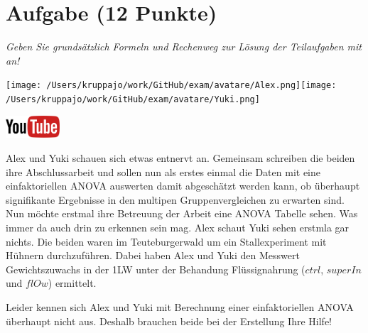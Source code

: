 \documentclass[a4paper, 9pt]{scrartcl}\usepackage[]{graphicx}\usepackage[]{xcolor}
\begin{document}
 
\clearpage

\section{Aufgabe \hfill (12 Punkte)}

\textit{Geben Sie grundsätzlich Formeln und Rechenweg zur Lösung der Teilaufgaben mit an!} \\[1Ex]
 

 
\begin{minipage}[t]{0.5\textwidth}
\texttt{[image: /Users/kruppajo/work/GitHub/exam/avatare/Alex.png]}\hspace{-4mm}\texttt{[image: /Users/kruppajo/work/GitHub/exam/avatare/Yuki.png]}
\end{minipage}
\begin{minipage}[t]{0.5\textwidth}
\hfill
\href{https://youtu.be/49hvImMwVyE}{\includegraphics[width = 2cm]{img/youtube}}
\end{minipage}
\vspace{1ex}



Alex und Yuki schauen sich etwas entnervt an. Gemeinsam schreiben die beiden ihre Abschlussarbeit und sollen nun als erstes einmal die Daten mit eine einfaktoriellen ANOVA auswerten damit abgeschätzt werden kann, ob überhaupt signifikante Ergebnisse in den multipen Gruppenvergleichen zu erwarten sind. Nun möchte erstmal ihre Betreuung der Arbeit eine ANOVA Tabelle sehen. Was immer da auch drin zu erkennen sein mag. Alex schaut Yuki sehen erstmla gar nichts. Die beiden waren im Teuteburgerwald um ein Stallexperiment mit Hühnern durchzuführen. Dabei haben Alex und Yuki den Messwert Gewichtszuwachs in der 1LW unter der Behandung Flüssignahrung ($ctrl$, $superIn$ und $flOw$) ermittelt.



\vspace{1ex}

Leider kennen sich Alex und Yuki mit Berechnung einer einfaktoriellen ANOVA überhaupt nicht aus. Deshalb brauchen beide bei der Erstellung Ihre Hilfe! 
\end{document}
